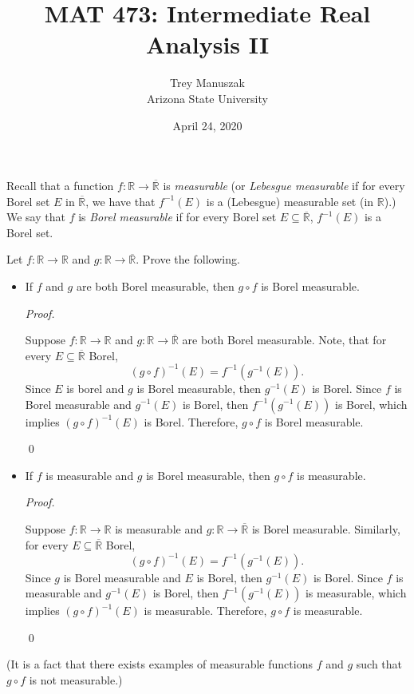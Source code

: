 \documentclass[12pt]{article}
\title{MAT 473: Intermediate Real Analysis II}
\date{April 24, 2020}
\author{Trey Manuszak\\ Arizona State University}
\newenvironment{problem}[2][Problem]{\begin{trivlist}
\item[\hskip \labelsep {\bfseries #1}\hskip \labelsep {\bfseries
#2.}]}{\end{trivlist}}
\newenvironment{sol}
    {\emph{Proof.}
    }
    {
    \qed
    }
\begin{document}


\maketitle
\newpage


\begin{problem}{45}
  Recall that a function $f : \mathbb{R} \to \overline{\mathbb{R}}$ is \textit{measurable} (or \textit{Lebesgue measurable} if for every Borel set $E$ in $\overline{\mathbb{R}}$, we have that $f^{-1}(E)$ is a (Lebesgue) measurable set (in $\mathbb{R}$).) We say that $f$ is \textit{Borel measurable} if for every Borel set $E \subseteq \overline{\mathbb{R}}$, $f^{-1}(E)$ is a Borel set.

  Let $f : \mathbb{R} \to \mathbb{R}$ and $g : \mathbb{R} \to \overline{\mathbb{R}}$. Prove the following. 
  \begin{itemize}
    \item[(a)] If $f$ and $g$ are both Borel measurable, then $g \circ f$ is Borel measurable.
    
    \begin{sol}
      Suppose $f : \mathbb{R} \to \mathbb{R}$ and $g : \mathbb{R} \to \overline{\mathbb{R}}$ are both Borel measurable. Note, that for every $E \subseteq \overline{\mathbb{R}}$ Borel, 
      $$(g \circ f)^{-1}(E) = f^{-1}(g^{-1}(E)).$$
      Since $E$ is borel and $g$ is Borel measurable, then $g^{-1}(E)$ is Borel. Since $f$ is Borel measurable and $g^{-1}(E)$ is Borel, then $f^{-1}(g^{-1}(E))$ is Borel, which implies $(g \circ f)^{-1}(E)$ is Borel. Therefore, $g \circ f$ is Borel measurable.
    \end{sol}
    
    \item[(b)] If $f$ is measurable and $g$ is Borel measurable, then $g \circ f$ is measurable.
    
    \begin{sol}
      Suppose $f : \mathbb{R} \to \mathbb{R}$ is measurable and $g : \mathbb{R} \to \overline{\mathbb{R}}$ is Borel measurable. Similarly, for every $E \subseteq \overline{\mathbb{R}}$ Borel, 
      $$(g \circ f)^{-1}(E) = f^{-1}(g^{-1}(E)).$$
      Since $g$ is Borel measurable and $E$ is Borel, then $g^{-1}(E)$ is Borel. Since $f$ is measurable and $g^{-1}(E)$ is Borel, then $f^{-1}(g^{-1}(E))$ is measurable, which implies $(g \circ f)^{-1}(E)$ is measurable. Therefore, $g \circ f$ is measurable.
    \end{sol}
  \end{itemize}
  (It is a fact that there exists examples of measurable functions $f$ and $g$ such that $g \circ f$ is not measurable.)
\end{problem}
\end{document}
